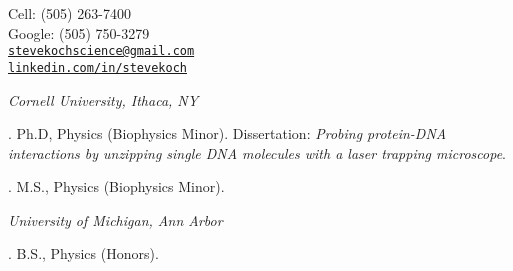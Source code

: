 \documentclass[11pt]{article}
\makeatletter
\def\myemail{stevekochscience@gmail.com}
\def\myweb{http://www.linkedin.com/in/stevekoch/}
\def\mycell{(505) 263-7400}
\def\mygoogle{(505) 750-3279}
\makeatother
\begin{document}
\begin{minipage}[t]{2.95in}
  
\end{minipage}
\hfill     
\hfill
\begin{minipage}[t]{1.7in}
  \flushright \footnotesize Cell: \mycell \\ 
  Google: \mygoogle  \\ 
  {\scriptsize  \texttt{\href{mailto:\myemail}{\myemail}}} \\
  {\scriptsize  \texttt{\href{\myweb}{linkedin.com/in/stevekoch}}}
\end{minipage}


\medskip

\reversemarginpar

\medskip       



\noindent\emph{Cornell University, Ithaca, NY \vspace{0.01in}}

. Ph.D, Physics (Biophysics Minor). Dissertation: \emph{Probing protein-DNA interactions by unzipping single DNA molecules with a laser trapping microscope}. %

. M.S., Physics (Biophysics Minor). 


\medskip
\noindent\emph{University of Michigan, Ann Arbor\vspace{0.02in}}

. B.S., Physics (Honors). \vspace{0.01in}

\bigskip


\end{document}
